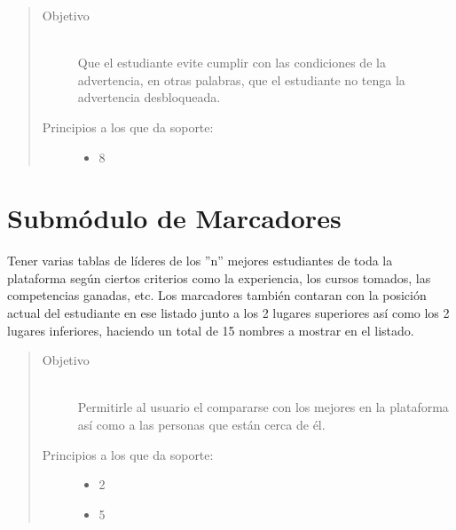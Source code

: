     \begin{quote}
    \begin{description}
    \item[Objetivo] \hfill\\
        Que el estudiante evite cumplir con las condiciones de la advertencia, en otras palabras, que el estudiante no tenga la advertencia desbloqueada.

    \item[Principios a los que da soporte:] \hfill
        \begin{itemize}
            \item 8 \principioVIII
        \end{itemize}
    \end{description}
    \end{quote}

\section{Submódulo de Marcadores}

    Tener varias tablas de líderes de los ''n'' mejores estudiantes de toda la plataforma según ciertos criterios como la experiencia, los cursos tomados, las competencias ganadas, etc. Los marcadores también contaran con la posición actual del estudiante en ese listado junto a los 2 lugares superiores así como los 2 lugares inferiores, haciendo un total de 15 nombres a mostrar en el listado.

    \begin{quote}
    \begin{description}
    \item[Objetivo] \hfill\\
        Permitirle al usuario el compararse con los mejores en la plataforma así como a las personas que están cerca de él.

    \item[Principios a los que da soporte:] \hfill
        \begin{itemize}
            \item 2 \principioII
            \item 5 \principioV
        \end{itemize}
    \end{description}
    \end{quote}

\clearpage